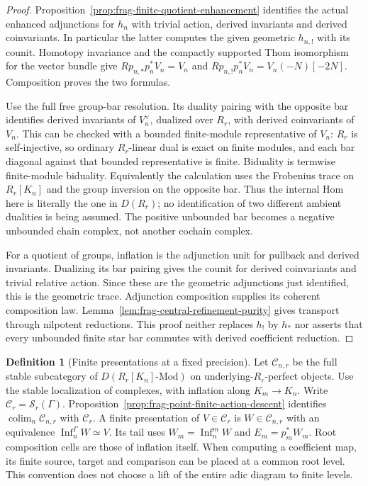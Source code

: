 \documentclass[11pt]{article}
\theoremstyle{definition}
\newtheorem{definition}[theorem]{Definition}
\theoremstyle{remark}
\begin{document}
\begin{proof}
Proposition~\ref{prop:frag-finite-quotient-enhancement} identifies the
actual enhanced adjunctions for $h_n$ with trivial action, derived
invariants and derived coinvariants.  In particular the latter
computes the given geometric $h_{n,!}$ with its counit.
Homotopy invariance and the compactly supported Thom isomorphism for the
vector bundle give $Rp_{n,*}p_n^*V_n=V_n$ and
$Rp_{n,!}p_n^*V_n=V_n(-N)[-2N]$.  Composition proves the two formulas.

Use the full free group-bar resolution.  Its duality pairing with the
opposite bar identifies derived invariants of $V_n^\vee$, dualized over
$R_r$, with derived coinvariants of $V_n$.  This can be checked with a
bounded finite-module representative of $V_n$: $R_r$ is self-injective,
so ordinary $R_r$-linear dual is exact on finite modules, and each bar
diagonal against that bounded representative is finite.  Biduality is
termwise finite-module biduality.  Equivalently the calculation uses the
Frobenius trace on $R_r[K_n]$ and the group inversion on the opposite bar.
Thus the internal Hom here is literally the one in $D(R_r)$; no
identification of two different ambient dualities is being assumed.
The positive unbounded bar becomes a negative unbounded chain complex,
not another cochain complex.

For a quotient of groups, inflation is the adjunction unit for pullback
and derived invariants.  Dualizing its bar pairing gives the counit for
derived coinvariants and trivial relative action.  Since these are the
geometric adjunctions just identified, this is the geometric trace.
Adjunction composition supplies its coherent composition law.
Lemma~\ref{lem:frag-central-refinement-purity} gives transport through
nilpotent reductions.  This proof neither replaces $h_!$ by $h_*$ nor
asserts that every unbounded finite star bar commutes with derived
coefficient reduction.
\end{proof}

\begin{definition}[Finite presentations at a fixed precision]
\label{def:frag-compatible-presenting-tails}
Let $\mathcal C_{n,r}$ be the full stable subcategory of
$D(R_r[K_n]\text{-}\mathrm{Mod})$ on underlying-$R_r$-perfect objects.
Use the stable localization of complexes, with inflation along
$K_m\to K_n$.  Write $\mathcal C_r=\mathcal S_r(\Gamma)$.
Proposition~\ref{prop:frag-point-finite-action-descent} identifies
$\operatorname*{colim}_n\mathcal C_{n,r}$ with $\mathcal C_r$.
A finite presentation of $V\in\mathcal C_r$ is $W\in\mathcal C_{n,r}$
with an equivalence $\operatorname{Inf}_n^\Gamma W\simeq V$.
Its tail uses $W_m=\operatorname{Inf}_n^mW$ and $E_m=p_m^*W_m$.
Root composition cells are those of inflation itself.
When computing a coefficient map, its finite source, target and
comparison can be placed at a common root level.  This convention
does not choose a lift of the entire adic diagram to finite levels.
\end{definition}
\end{document}
